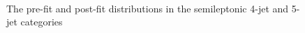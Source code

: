 \begin{figure}
\begin{centering}
\\
\caption[The pre-fit and post-fit distributions in the semileptonic 4-jet and 5-jet categories]{The pre-fit and post-fit distributions in the semileptonic 4-jet and 5-jet categories}
\label{fig:tth_postfit1}
\end{centering}
\end{figure}

